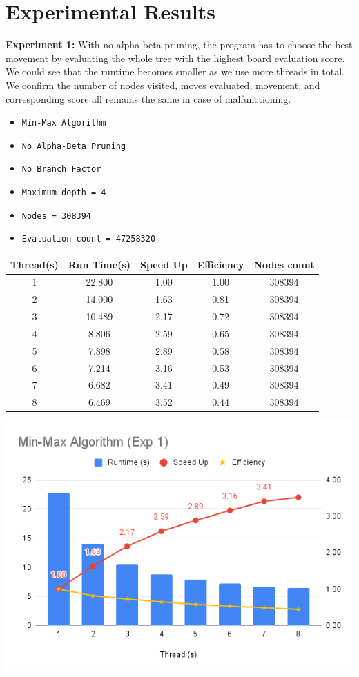 \documentclass[sigconf]{acmart}
\begin{document}
\section{Experimental Results}


{\bfseries Experiment 1:}
With no alpha beta pruning, the program has to choose the best movement by evaluating the whole tree with the highest board evaluation score. We could see that the runtime becomes smaller as we use more threads in total. We confirm the number of nodes visited, moves evaluated, movement, and corresponding score all remains the same in case of malfunctioning. 

\begin{itemize}
\item {\verb|Min-Max Algorithm|}
\item {\verb|No Alpha-Beta Pruning|}
\item {\verb|No Branch Factor|}
\item {\verb|Maximum depth = 4|}
\item {\verb|Nodes = 308394|}
\item {\verb|Evaluation count = 47258320|}
\end{itemize}
\begin{center}
  \label{tab:commands}
  \begin{tabular}{c c c c c}
    \toprule
    Thread(s)& Run Time(s) & Speed Up & Efficiency & Nodes count\\
    \midrule
    1 & 22.800 & 1.00 & 1.00 & 308394\\
    2 & 14.000 & 1.63 & 0.81 & 308394\\
    3 & 10.489 & 2.17 & 0.72 & 308394\\
    4 &  8.806 & 2.59 & 0.65 & 308394\\
    5 &  7.898 & 2.89 & 0.58 & 308394\\
    6 &  7.214 & 3.16 & 0.53 & 308394\\
    7 &  6.682 & 3.41 & 0.49 & 308394\\
    8 &  6.469 & 3.52 & 0.44 & 308394\\
    \bottomrule
  \end{tabular}
\end{center}
\includegraphics[scale=0.40]{images/exp1.png}
\end{document}
